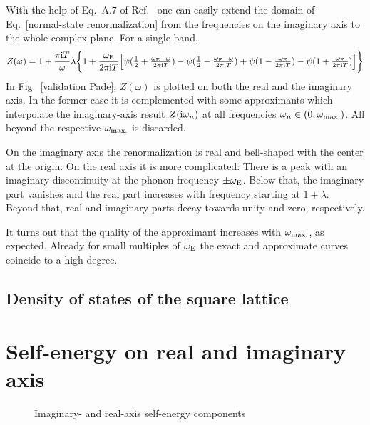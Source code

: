 With the help of Eq.~A.7 of Ref.~ one can easily
extend the domain of Eq.~\ref{normal-state renormalization} from the
 frequencies on the imaginary axis to the whole complex plane.
For a single band,
%
\begin{equation*}
    Z(\omega) = 1 + \frac {\pi \mathrm i T} \omega \lambda \bigg \{
        1 + \frac{\omega \sb{\text{E}}}{2 \pi \mathrm i T} \Big[
              \psi(\tfrac 1 2 + \tfrac{\omega \sb{\text{E}} + \omega}{2 \pi \mathrm i T})
            - \psi(\tfrac 1 2 - \tfrac{\omega \sb{\text{E}} - \omega}{2 \pi \mathrm i T})
            + \psi(1 - \tfrac{\omega \sb{\text{E}}}{2 \pi \mathrm i T})
            - \psi(1 + \tfrac{\omega \sb{\text{E}}}{2 \pi \mathrm i T})
        \Big]
    \bigg \}
\end{equation*}
%
In Fig.~\ref{validation Pade}, $Z(\omega)$ is plotted on both the real and the
imaginary axis. In the former case it is complemented with some 
approximants which interpolate the imaginary-axis result $Z(\mathrm i \omega_n)$ at all
 frequencies $\omega_n \in (0, \omega \sb{\text{max.}})$. All beyond
the respective $\omega \sb{\text{max.}}$ is discarded.

On the imaginary axis the renormalization is real and bell-shaped with the
center at the origin. On the real axis it is more complicated: There is a peak
with an imaginary discontinuity at the phonon frequency $\pm \omega \sb{\text{E}}$.
Below that, the imaginary part vanishes and the real part increases with
frequency starting at $1 + \lambda$. Beyond that, real and imaginary parts decay
towards unity and zero, respectively.

It turns out that the quality of the  approximant increases with
$\omega \sb{\text{max.}}$, as expected. Already for small multiples of $\omega \sb{\text{E}}$
the exact and approximate curves coincide to a high degree.

\subsection{Density of states of the square lattice}

\section{Self-energy on real and imaginary axis}

\begin{figure}
    \small
	
	
	
	
	
	
	\caption{Imaginary- and real-axis self-energy components}
\end{figure}

